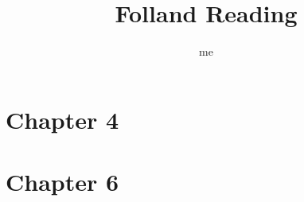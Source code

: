 \documentclass[12pt, oneside]{article}
\title{Folland Reading}
\author{me}
\begin{document}
\maketitle

\section{Chapter 4}


















\section{Chapter 6}









\newpage
\end{document}
